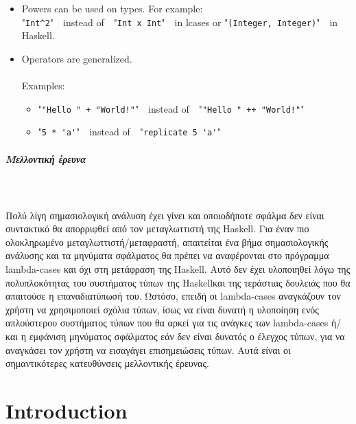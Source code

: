 \documentclass[diploma]{softlab-thesis}
\def\H{Haskell}
\def\pend{\mbox{}\\\\}
\begin{document}
\begin{itemize}
\item Powers can be used on types.  For example:\\

"\verb|Int^2|"\ \  instead of\ \  "\verb|Int x Int|"\ \  in lcases or
"\verb|(Integer, Integer)|"\ \
in \H. \\

\item Operators are generalized. \\\\
Examples:

\begin{itemize}

\item
"\verb|"Hello " + "World!"|"\ \ instead of\ \ "\verb|"Hello " ++ "World!"|"

\item
"\verb|5 * 'a'|"\ \ instead of\ \ "\verb|replicate 5 'a'|"

\end{itemize}


\end{itemize}

\newpage
\paragraph{Μελλοντική έρευνα}\pend
Πολύ λίγη σημασιολογική ανάλυση έχει γίνει και οποιοδήποτε σφάλμα δεν είναι
συντακτικό θα απορριφθεί από τον μεταγλωττιστή της \H. Για έναν
πιο ολοκληρωμένο μεταγλωττιστή/μεταφραστή, απαιτείται ένα βήμα σημασιολογικής
ανάλυσης και τα μηνύματα σφάλματος θα πρέπει να αναφέρονται στο πρόγραμμα
lambda-cases και όχι στη μετάφραση της \H. Αυτό δεν έχει υλοποιηθεί λόγω της
πολυπλοκότητας του συστήματος τύπων της \H και της τεράστιας δουλειάς που θα
απαιτούσε η επαναδιατύπωσή του. Ωστόσο, επειδή οι lambda-cases αναγκάζουν τον
χρήστη να χρησιμοποιεί σχόλια τύπων, ίσως να είναι δυνατή η υλοποίηση ενός
απλούστερου συστήματος τύπων που θα αρκεί για τις ανάγκες των lambda-cases
ή/και η εμφάνιση μηνύματος σφάλματος εάν δεν είναι δυνατός ο έλεγχος τύπων,
για να αναγκάσει τον χρήστη να εισαγάγει επισημειώσεις τύπων.
Αυτά είναι οι σημαντικότερες κατευθύνσεις μελλοντικής έρευνας.


\englishtext

\chapter{Introduction}
\end{document}
